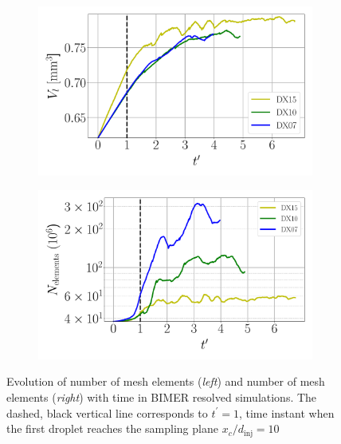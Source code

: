 \begin{figure}[ht]
\centering
\begin{subfigure}[b]{0.45\textwidth}
	\centering
   \includegraphics[scale=0.2]{./part3_applications/figures_ch8_resolved/BIMER_liquid_volume_increase}
   \label{fig:BIMER_liquid_volume_evolution} 
\end{subfigure}
\hfill
\begin{subfigure}[b]{0.45\textwidth}
	\centering
   \includegraphics[scale=0.24]{./part3_applications/figures_ch8_resolved/BIMER_nelem_increase}
   \label{fig:BIMER_nelem_increase}
\end{subfigure}
   \caption[Evolution of number of mesh elements (\textsl{left}) and number of mesh elements (\textsl{right}) with time in BIMER resolved simulations]{Evolution of number of mesh elements (\textsl{left}) and number of mesh elements (\textsl{right}) with time in BIMER resolved simulations. The dashed, black vertical line corresponds to $t^\prime = 1$, time instant when the first droplet reaches the sampling plane $x_c/d_\mathrm{inj} = 10$}
\label{fig:BIMER_volume_nelem_evolution}
\end{figure}

